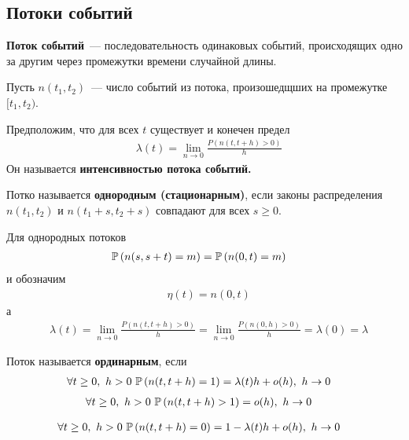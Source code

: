 \subsection{Потоки событий}
\begin{Def}
    \textbf{Поток событий}~--- последовательность одинаковых событий,
    происходящих одно за другим через промежутки времени случайной длины.
\end{Def}
\begin{Des}
    Пусть $n(t_1,t_2)$~--- число событий из потока, произошедщших на промежутке
    $[t_1, t_2)$.
\end{Des}
\begin{Def}
    Предположим, что для всех $t$ существует и конечен предел
    \begin{align*}
      & \lambda(t) = \lim_{n \to 0}\frac{P(n(t,t+h) > 0)}{h}
    \end{align*}
    Он называется \textbf{интенсивностью потока событий.}
\end{Def}
\begin{Def}
    Потко называется \textbf{однородным (стационарным)}, если законы
    распределения $n(t_1,t_2)$ и $n(t_1+s, t_2+s)$ совпадают для всех $s \geq
    0$.
\end{Def}
\begin{Des}
    Для однородных потоков
    \begin{align*}
      & \mathbb{P}\left( n(s,s+t) = m \right) = \mathbb{P}\left( n(0,t) = m \right)
    \end{align*}
    и обозначим
    \begin{align*}
      & \eta(t) = n(0, t)
    \end{align*}
    а
    \begin{align*}
      & \lambda(t) = \lim_{n \to 0}\frac{P(n(t,t+h) > 0)}{h} = \lim_{n \to 0}\frac{P(n(0,h) > 0)}{h} = \lambda(0) = \lambda
    \end{align*}  
\end{Des}
\begin{Def}
    Поток называется \textbf{ординарным}, если
    \begin{align*}
      & \forall t \geq 0, \ h > 0 \ \mathbb{P}\left( n(t,t+h) = 1 \right) = \lambda(t)h+o(h), \ h \to 0
    \end{align*}
    \begin{align*}
      & \forall t \geq 0, \ h > 0 \ \mathbb{P}\left( n(t,t+h) > 1 \right) = o(h), \ h \to 0
    \end{align*}
\end{Def}
\begin{corollary}
    \begin{align*}
      & \forall t \geq 0, \ h > 0 \ \mathbb{P}\left( n(t,t+h) = 0 \right) = 1-\lambda(t) h + o(h), \ h \to 0
    \end{align*}
\end{corollary}
